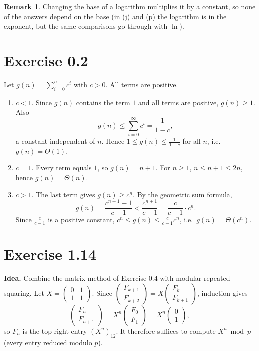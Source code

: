 \documentclass[11pt]{article}
\theoremstyle{definition}
\newtheorem*{remark}{Remark}
\begin{document}
\begin{remark}
Changing the base of a logarithm multiplies it by a constant, so none of the answers depend on the base
(in (j) and (p) the logarithm is in the exponent, but the same comparisons go through with $\ln$).
\end{remark}

\section*{Exercise 0.2}

Let $g(n)=\sum_{i=0}^{n}c^i$ with $c>0$. All terms are positive.

\begin{enumerate}[label=(\alph*), leftmargin=2.2em]
\item $c<1$. Since $g(n)$ contains the term $1$ and all terms are positive, $g(n)\ge 1$. Also
  \[
    g(n)\le\sum_{i=0}^{\infty}c^i=\frac{1}{1-c},
  \]
  a constant independent of $n$. Hence $1\le g(n)\le\frac1{1-c}$ for all $n$, i.e.\ $g(n)=\Theta(1)$.

\item $c=1$. Every term equals $1$, so $g(n)=n+1$. For $n\ge1$, $n\le n+1\le 2n$, hence $g(n)=\Theta(n)$.

\item $c>1$. The last term gives $g(n)\ge c^n$. By the geometric sum formula,
  \[
    g(n)=\frac{c^{n+1}-1}{c-1}<\frac{c^{n+1}}{c-1}=\frac{c}{c-1}\cdot c^n .
  \]
  Since $\frac{c}{c-1}$ is a positive constant, $c^n\le g(n)\le\frac{c}{c-1}c^n$, i.e.\ $g(n)=\Theta(c^n)$.
\end{enumerate}

\section*{Exercise 1.14}

\textbf{Idea.} Combine the matrix method of Exercise 0.4 with modular repeated squaring.
Let $X=\begin{pmatrix}0&1\\1&1\end{pmatrix}$. Since
$\begin{pmatrix}F_{k+1}\\F_{k+2}\end{pmatrix}=X\begin{pmatrix}F_k\\F_{k+1}\end{pmatrix}$, induction gives
\[
  \begin{pmatrix}F_n\\F_{n+1}\end{pmatrix}=X^n\begin{pmatrix}F_0\\F_1\end{pmatrix}
  =X^n\begin{pmatrix}0\\1\end{pmatrix},
\]
so $F_n$ is the top-right entry $(X^n)_{12}$. It therefore suffices to compute $X^n \bmod p$
(every entry reduced modulo $p$).
\end{document}
